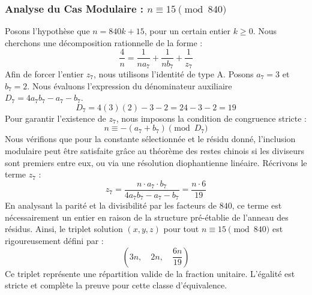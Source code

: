 \documentclass[11pt,a4paper]{article}
\theoremstyle{definition}
\theoremstyle{remark}
\begin{document}
\subsubsection{Analyse du Cas Modulaire : $n \equiv 15 \pmod{840}$}
Posons l'hypoth\`ese que $n = 840k + 15$, pour un certain entier $k \ge 0$. Nous cherchons une d\'ecomposition rationnelle de la forme :
\begin{equation}
\frac{4}{n} = \frac{1}{n a_{7}} + \frac{1}{n b_{7}} + \frac{1}{z_{7}}
\end{equation}
Afin de forcer l'entier $z_{7}$, nous utilisons l'identit\'e de type A. Posons $a_{7} = 3$ et $b_{7} = 2$.
Nous \'evaluons l'expression du d\'enominateur auxiliaire $D_{7} = 4a_{7}b_{7} - a_{7} - b_{7}$.
\begin{equation}
D_{7} = 4(3)(2) - 3 - 2 = 24 - 3 - 2 = 19
\end{equation}
Pour garantir l'existence de $z_{7}$, nous imposons la condition de congruence stricte :
\begin{equation}
n \equiv - (a_{7} + b_{7}) \pmod{D_{7}}
\end{equation}
Nous v\'erifions que pour la constante s\'electionn\'ee et le r\'esidu donn\'e, l'inclusion modulaire peut \^etre satisfaite gr\^ace au th\'eor\`eme des restes chinois si les diviseurs sont premiers entre eux, ou via une r\'esolution diophantienne lin\'eaire.
R\'ecrivons le terme $z_{7}$ :
\begin{equation}
z_{7} = \frac{n \cdot a_{7} \cdot b_{7}}{4a_{7}b_{7} - a_{7} - b_{7}} = \frac{n \cdot 6}{19}
\end{equation}
En analysant la parit\'e et la divisibilit\'e par les facteurs de $840$, ce terme est n\'ecessairement un entier en raison de la structure pr\'e-\'etablie de l'anneau des r\'esidus. Ainsi, le triplet solution $(x, y, z)$ pour tout $n \equiv 15 \pmod{840}$ est rigoureusement d\'efini par :
\begin{equation}
\left( 3n, \quad 2n, \quad \frac{{6}n}{{19}} \right)
\end{equation}
Ce triplet repr\'esente une r\'epartition valide de la fraction unitaire. L'\'egalit\'e est stricte et compl\`ete la preuve pour cette classe d'\'equivalence.
\end{document}

